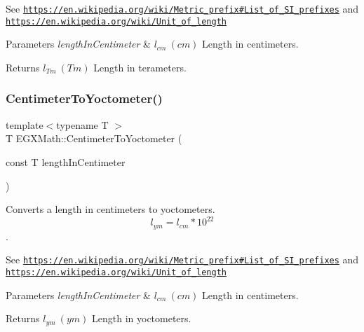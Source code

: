 See \href{https://en.wikipedia.org/wiki/Metric_prefix#List_of_SI_prefixes}{\tt https\+://en.\+wikipedia.\+org/wiki/\+Metric\+\_\+prefix\#\+List\+\_\+of\+\_\+\+S\+I\+\_\+prefixes} and \href{https://en.wikipedia.org/wiki/Unit_of_length}{\tt https\+://en.\+wikipedia.\+org/wiki/\+Unit\+\_\+of\+\_\+length} 
\begin{DoxyParams}{Parameters}
{\em length\+In\+Centimeter} & $ l_{cm}\ (cm)$ Length in centimeters. \\
\hline
\end{DoxyParams}
\begin{DoxyReturn}{Returns}
$ l_{Tm}\ (Tm)$ Length in terameters. 
\end{DoxyReturn}
\mbox{\label{group___e_g_x_math-_conversions-_length_conversions-_centimeter-_s_i_ga251be5adc836253a22a995d9f2ce6782}} 
\subsubsection{\texorpdfstring{Centimeter\+To\+Yoctometer()}{CentimeterToYoctometer()}}
{\footnotesize\ttfamily template$<$typename T $>$ \\
T E\+G\+X\+Math\+::\+Centimeter\+To\+Yoctometer (\begin{DoxyParamCaption}\item[{const T}]{length\+In\+Centimeter }\end{DoxyParamCaption})}



Converts a length in centimeters to yoctometers. \[ l_{ym}=l_{cm} * 10^{22} \]. 

See \href{https://en.wikipedia.org/wiki/Metric_prefix#List_of_SI_prefixes}{\tt https\+://en.\+wikipedia.\+org/wiki/\+Metric\+\_\+prefix\#\+List\+\_\+of\+\_\+\+S\+I\+\_\+prefixes} and \href{https://en.wikipedia.org/wiki/Unit_of_length}{\tt https\+://en.\+wikipedia.\+org/wiki/\+Unit\+\_\+of\+\_\+length} 
\begin{DoxyParams}{Parameters}
{\em length\+In\+Centimeter} & $ l_{cm}\ (cm)$ Length in centimeters. \\
\hline
\end{DoxyParams}
\begin{DoxyReturn}{Returns}
$ l_{ym}\ (ym)$ Length in yoctometers. 
\end{DoxyReturn}
\mbox{\label{group___e_g_x_math-_conversions-_length_conversions-_centimeter-_s_i_gace13ddc9d41561595a03d858577763c3}} 
